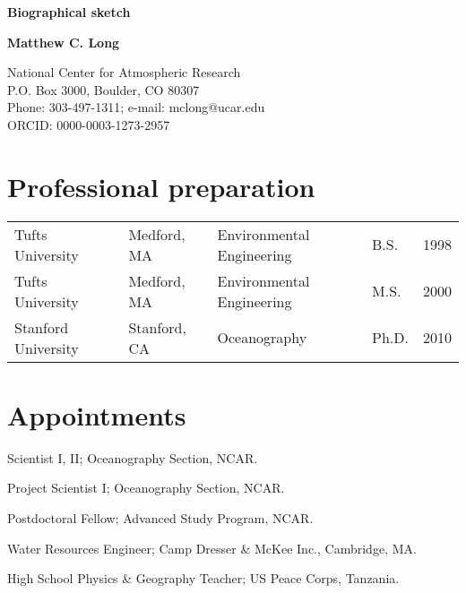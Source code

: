 \documentclass[12pt]{article}
\newcounter{H}
\begin{document}
\thispagestyle{empty}

\begin{center}
\noindent
\textbf{Biographical sketch}

\textbf{Matthew C. Long}

\noindent
National Center for Atmospheric Research\\
P.O. Box 3000, Boulder, CO 80307\\
Phone: 303-497-1311; e-mail: mclong@ucar.edu\\
ORCID: 0000-0003-1273-2957
\end{center}
\section{Professional preparation}
\begin{tabular}{lllll}
Tufts University	&	Medford, MA 	& Environmental Engineering	& B.S.	& 1998 	\\
Tufts University	&  	Medford, MA		& Environmental Engineering	& M.S.	& 2000	\\
Stanford University	&	Stanford, CA	& Oceanography				& Ph.D.	& 2010
\end{tabular}

\section{Appointments}
\begin{description}[style=multiline,leftmargin=2.8cm,font=\normalfont]
\setlength{\itemsep}{-0.5em}
\item[2014--present] {Scientist I, II}; Oceanography Section, NCAR.
\item[2012--2014] {Project Scientist I}; Oceanography Section, NCAR.
\item[2010--2012] {Postdoctoral Fellow}; {Advanced Study Program}, NCAR.
\item[2003--2004] {Water Resources Engineer}; {Camp Dresser \& McKee Inc.}, Cambridge, MA.
\item[2000--2002] {High School Physics \& Geography Teacher}; US Peace Corps, Tanzania.
\end{description}
\end{document}
